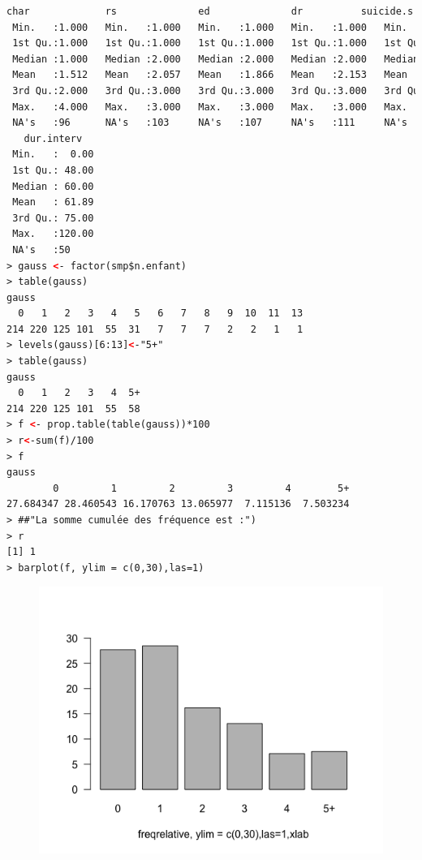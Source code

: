 \begin{lstlisting}[language=html]
      char             rs              ed              dr          suicide.s        suicide.hr      suicide.past   
 Min.   :1.000   Min.   :1.000   Min.   :1.000   Min.   :1.000   Min.   :0.0000   Min.   :0.0000   Min.   :0.0000  
 1st Qu.:1.000   1st Qu.:1.000   1st Qu.:1.000   1st Qu.:1.000   1st Qu.:0.0000   1st Qu.:0.0000   1st Qu.:0.0000  
 Median :1.000   Median :2.000   Median :2.000   Median :2.000   Median :0.0000   Median :0.0000   Median :0.0000  
 Mean   :1.512   Mean   :2.057   Mean   :1.866   Mean   :2.153   Mean   :0.7942   Mean   :0.2013   Mean   :0.2841  
 3rd Qu.:2.000   3rd Qu.:3.000   3rd Qu.:3.000   3rd Qu.:3.000   3rd Qu.:1.0000   3rd Qu.:0.0000   3rd Qu.:1.0000  
 Max.   :4.000   Max.   :3.000   Max.   :3.000   Max.   :3.000   Max.   :5.0000   Max.   :1.0000   Max.   :1.0000  
 NA's   :96      NA's   :103     NA's   :107     NA's   :111     NA's   :41       NA's   :39       NA's   :14      
   dur.interv    
 Min.   :  0.00  
 1st Qu.: 48.00  
 Median : 60.00  
 Mean   : 61.89  
 3rd Qu.: 75.00  
 Max.   :120.00  
 NA's   :50      
> gauss <- factor(smp$n.enfant)
> table(gauss)
gauss
  0   1   2   3   4   5   6   7   8   9  10  11  13 
214 220 125 101  55  31   7   7   7   2   2   1   1 
> levels(gauss)[6:13]<-"5+"
> table(gauss)
gauss
  0   1   2   3   4  5+ 
214 220 125 101  55  58 
> f <- prop.table(table(gauss))*100
> r<-sum(f)/100
> f
gauss
        0         1         2         3         4        5+ 
27.684347 28.460543 16.170763 13.065977  7.115136  7.503234 
> ##"La somme cumulée des fréquence est :")
> r
[1] 1
> barplot(f, ylim = c(0,30),las=1)
\end{lstlisting}

\begin{figure}[H]\begin{center}\includegraphics[scale=1]{ilu/lab2-3.png}\end{center}\end{figure}

